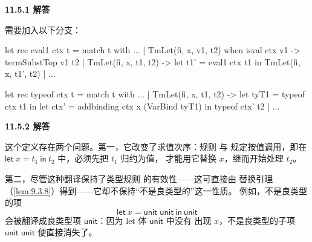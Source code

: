 \begin{taplauthorsolutionentrybox}
\label{sol:author:11.5.1}
\textbf{11.5.1 解答}

需要加入以下分支：
\end{taplauthorsolutionentrybox}

\begin{taplocamlcode}
let rec eval1 ctx t =
  match t with
    ...
  | TmLet(fi, x, v1, t2) when isval ctx v1 ->
      termSubstTop v1 t2
  | TmLet(fi, x, t1, t2) ->
      let t1' = eval1 ctx t1 in
      TmLet(fi, x, t1', t2)
  | ...

let rec typeof ctx t =
  match t with
    ...
  | TmLet(fi, x, t1, t2) ->
      let tyT1 = typeof ctx t1 in
      let ctx' = addbinding ctx x (VarBind tyT1) in
      typeof ctx' t2
  | ...
\end{taplocamlcode}


\begin{taplauthorsolutionentrybox}
\label{sol:author:11.5.2}
\textbf{11.5.2 解答}

这个定义存在两个问题。第一，它改变了求值次序：规则 
与  规定按值调用，即在
\(\mathsf{let}\ x=t_1\ \mathsf{in}\ t_2\) 中，必须先把 \(t_1\) 归约为值，
才能用它替换 \(x\)，继而开始处理 \(t_2\)。

第二，尽管这种翻译保持了类型规则  的有效性——这可直接由
替换引理（\cref{lem:9.3.8}）得到——它却不保持“不是良类型的”这一性质。
例如，不是良类型的项
\[
  \mathsf{let}\ x=\mathsf{unit}\;\mathsf{unit}\ \mathsf{in}\ \mathsf{unit}
\]
会被翻译成良类型项 \(\mathsf{unit}\)：因为 let 体 \(\mathsf{unit}\) 中没有
出现 \(x\)，不是良类型的子项 \(\mathsf{unit}\;\mathsf{unit}\) 便直接消失了。

\end{taplauthorsolutionentrybox}

